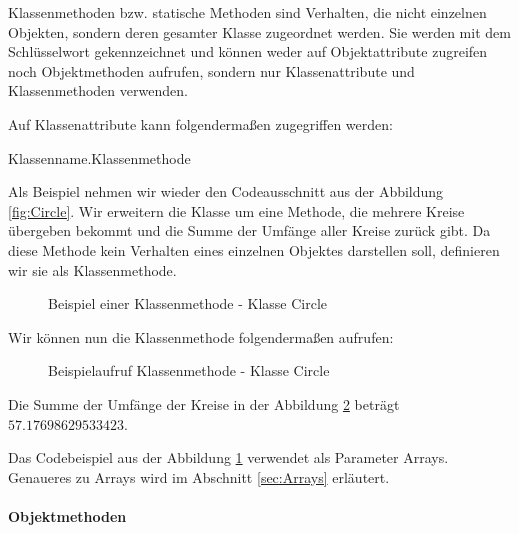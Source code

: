 \documentclass{tuda-pub}
\begin{document}
  Klassenmethoden bzw. statische Methoden sind Verhalten, die nicht einzelnen Objekten, sondern
  deren gesamter Klasse zugeordnet werden. Sie werden mit dem Schlüsselwort 
  gekennzeichnet und können weder auf Objektattribute zugreifen noch Objektmethoden aufrufen,
  sondern nur Klassenattribute und Klassenmethoden verwenden.

  \br

  Auf Klassenattribute kann folgendermaßen zugegriffen werden:

  \begin{center}
    Klassenname.Klassenmethode
  \end{center}

  Als Beispiel nehmen wir wieder den Codeausschnitt aus der Abbildung \ref{fig:Circle}. Wir
  erweitern die Klasse um eine Methode, die mehrere Kreise übergeben bekommt und die Summe der
  Umfänge aller Kreise zurück gibt. Da diese Methode kein Verhalten eines einzelnen Objektes
  darstellen soll, definieren wir sie als Klassenmethode.

  \begin{figure}[h]
    \centering
    
    \caption{Beispiel einer Klassenmethode - Klasse Circle}
    \label{fig:Circle_Circumfences}
  \end{figure}

  Wir können nun die Klassenmethode folgendermaßen aufrufen:

  \begin{figure}[h]
    \centering
    
    \caption{Beispielaufruf Klassenmethode - Klasse Circle}
    \label{fig:Circle_Circumfences_Example}
  \end{figure}

  Die Summe der Umfänge der Kreise in der Abbildung \ref{fig:Circle_Circumfences_Example} beträgt
  \(57.17698629533423\).


  \begin{note}[title=Information:]
    Das Codebeispiel aus der Abbildung \ref{fig:Circle_Circumfences} verwendet als Parameter
    Arrays. Genaueres zu Arrays wird im Abschnitt \ref{sec:Arrays} erläutert.
  \end{note}

  \paragraph{Objektmethoden}
\end{document}
